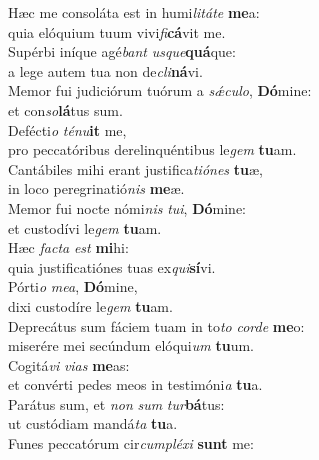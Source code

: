 \evenverse Hæc me consoláta est in humi\textit{li}\textit{tá}\textit{te} \textbf{me}a:~\*\\
\evenverse quia elóquium tuum vivi\textit{fi}\textbf{cá}vit me.\\
\oddverse Supérbi iníque agé\textit{bant} \textit{us}\textit{que}\textbf{quá}que:~\*\\
\oddverse a lege autem tua non de\textit{cli}\textbf{ná}vi.\\
\evenverse Memor fui judiciórum tuórum a \textit{sǽ}\textit{cu}\textit{lo}, \textbf{Dó}mine:~\*\\
\evenverse et con\textit{so}\textbf{lá}tus sum.\\
\oddverse Defécti\textit{o} \textit{té}\textit{nu}\textbf{it} me,~\*\\
\oddverse pro peccatóribus derelinquéntibus le\textit{gem} \textbf{tu}am.\\
\evenverse Cantábiles mihi erant justifica\textit{ti}\textit{ó}\textit{nes} \textbf{tu}æ,~\*\\
\evenverse in loco peregrinatió\textit{nis} \textbf{me}æ.\\
\oddverse Memor fui nocte nómi\textit{nis} \textit{tu}\textit{i}, \textbf{Dó}mine:~\*\\
\oddverse et custodívi le\textit{gem} \textbf{tu}am.\\
\evenverse Hæc \textit{fa}\textit{cta} \textit{est} \textbf{mi}hi:~\*\\
\evenverse quia justificatiónes tuas ex\textit{qui}\textbf{sí}vi.\\
\oddverse Pórti\textit{o} \textit{me}\textit{a}, \textbf{Dó}mine,~\*\\
\oddverse dixi custodíre le\textit{gem} \textbf{tu}am.\\
\evenverse Deprecátus sum fáciem tuam in to\textit{to} \textit{cor}\textit{de} \textbf{me}o:~\*\\
\evenverse miserére mei secúndum elóqui\textit{um} \textbf{tu}um.\\
\oddverse Cogitá\textit{vi} \textit{vi}\textit{as} \textbf{me}as:~\*\\
\oddverse et convérti pedes meos in testimóni\textit{a} \textbf{tu}a.\\
\evenverse Parátus sum, et \textit{non} \textit{sum} \textit{tur}\textbf{bá}tus:~\*\\
\evenverse ut custódiam mandá\textit{ta} \textbf{tu}a.\\
\oddverse Funes peccatórum cir\textit{cum}\textit{plé}\textit{xi} \textbf{sunt} me:~\*\\
